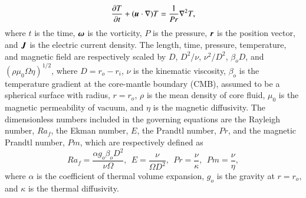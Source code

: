 %
\begin{equation}
\frac{\partial T}{\partial t} 
 + ( \mbox{\boldmath$u$} \cdot \nabla ) T =
 \frac{1}{Pr} \nabla^2 T ,
\label{eq:heat}
\end{equation}
%
where $t$ is the time, $\mbox{\boldmath$\omega$}$ is the vorticity, $P$ is the pressure, $\mbox{\boldmath$r$}$ is the position vector, and $\mbox{\boldmath$J$}$ is the electric current density.
The length, time, pressure, temperature, and magnetic field are respectively scaled by $D$, $D^2/\nu$, $\nu^2 /D^2$, $\beta_o D$, and $(\rho \mu_0 \Omega \eta )^{1/2}$, where $D = r_o - r_i$, $\nu$ is the kinematic viscosity, $\beta_o$ is the temperature gradient at the core-mantle boundary (CMB), 
{\color{red} assumed to be a spherical surface with radius,} $r = r_o$, $\rho$ is the mean density of core fluid, $\mu_0$ is the magnetic permeability of vacuum, and $\eta$ is the magnetic diffusivity.
The dimensionless numbers included in the governing equations are the Rayleigh number, $Ra_f$, the Ekman number, $E$, the Prandtl number, $Pr$, and the magnetic Prandtl number, $Pm$, which are respectively defined as
%
\begin{equation}
Ra_f = \frac{\alpha g_o \beta_o D^2}{\nu \Omega},~~
E = \frac{\nu}{\Omega D^2},~~
Pr = \frac{\nu}{\kappa},~~
Pm = \frac{\nu}{\eta},
\label{eq:dimensionless_numbers}
\end{equation}
%
where $\alpha$ is the coefficient of thermal volume expansion, $g_o$ is the gravity at $r = r_o$, and $\kappa$ is the thermal diffusivity.

